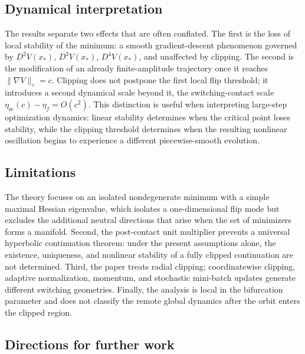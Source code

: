 \subsection{Dynamical interpretation}
\label{subsec:conclusion-interpretation}

The results separate two effects that are often conflated.  The
first is the loss of local stability of the minimum: a smooth
gradient-descent phenomenon governed by $D^2V(x_*)$, $D^3V(x_*)$,
$D^4V(x_*)$, and unaffected by clipping.  The second is the
modification of an already finite-amplitude trajectory once it
reaches $\|\nabla V\|_\diamond=c$.  Clipping does not postpone the
first local flip threshold; it introduces a second dynamical scale
beyond it, the switching-contact scale
$\eta_{\mathrm{sc}}(c)-\eta_f=O(c^2)$.  This distinction is useful
when interpreting large-step optimization dynamics: linear stability
determines when the critical point loses stability, while the
clipping threshold determines when the resulting nonlinear oscillation
begins to experience a different piecewise-smooth evolution.

\subsection{Limitations}
\label{subsec:conclusion-limitations}

The theory focuses on an isolated nondegenerate minimum with a simple
maximal Hessian eigenvalue, which isolates a one-dimensional flip mode
but excludes the additional neutral directions that arise when the set
of minimizers forms a manifold.  Second, the post-contact unit
multiplier prevents a universal hyperbolic continuation theorem:
under the present assumptions alone, the existence, uniqueness, and
nonlinear stability of a fully clipped continuation are not
determined.  Third, the paper treats radial clipping; coordinatewise
clipping, adaptive normalization, momentum, and stochastic mini-batch
updates generate different switching geometries.  Finally, the
analysis is local in the bifurcation parameter and does not classify
the remote global dynamics after the orbit enters the clipped region.

\subsection{Directions for further work}
\label{subsec:conclusion-future}

